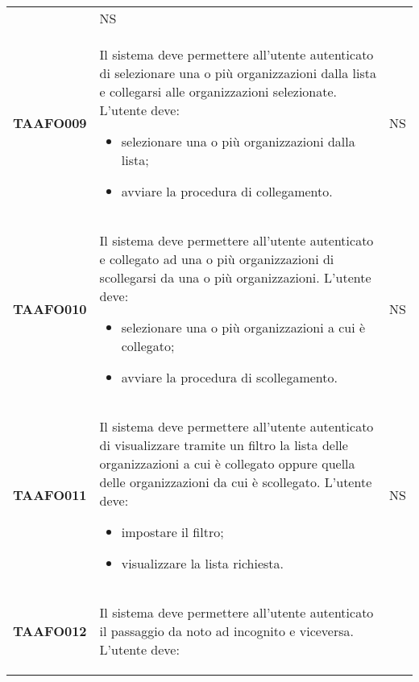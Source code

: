\documentclass[../piano-di-qualifica.tex]{subfiles}
\begin{document}
\begin{centering}
\begin{longtable}[H]{>{\centering\bfseries}m{3cm} >{}p{10cm} >{\centering\arraybackslash}m{3cm}}
\begin{itemize}
                        \end{itemize}
                      & NS \\ 
        TAAFO009      & Il sistema deve permettere all’utente autenticato di selezionare una o più organizzazioni dalla lista e collegarsi alle organizzazioni selezionate. \newline 
                        L’utente deve: 
                        \begin{itemize} 
                          \item selezionare una o più organizzazioni dalla lista;
                          \item avviare la procedura di collegamento.
                        \end{itemize}
                      & NS \\   
        TAAFO010      & Il sistema deve permettere all’utente autenticato e collegato ad una o più organizzazioni di scollegarsi da una o più organizzazioni. \newline 
                        L’utente deve:  
                        \begin{itemize} 
                          \item selezionare una o più organizzazioni a cui è collegato;
                          \item avviare la procedura di scollegamento.
                        \end{itemize}
                      & NS \\ 
        TAAFO011      & Il sistema deve permettere all’utente autenticato di visualizzare tramite un filtro la lista delle organizzazioni a cui è collegato oppure quella delle organizzazioni da cui è scollegato. \newline 
                      L’utente deve:  
                      \begin{itemize} 
                        \item impostare il filtro;
                        \item visualizzare la lista richiesta.
                      \end{itemize}
                      & NS \\ 
        TAAFO012      & Il sistema deve permettere all’utente autenticato il passaggio da noto ad incognito e viceversa. \newline 
                      L’utente deve:  
                      \begin{itemize} 

\end{itemize}
\end{longtable}
\end{centering}
\end{document}
